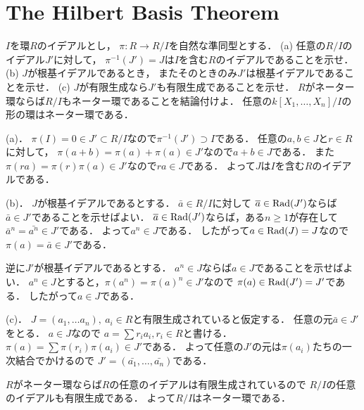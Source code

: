 \section{The Hilbert Basis Theorem}

\begin{prob}
  $I$を環$R$のイデアルとし，
  $\pi : R \to R/I$を自然な準同型とする．
  (a) 任意の$R/I$のイデアル$J'$に対して，
  $\pi^{-1}(J') = J$は$I$を含む$R$のイデアルであることを示せ．
  (b) $J$が根基イデアルであるとき，
  またそのときのみ$J'$は根基イデアルであることを示せ．
  (c) $J$が有限生成なら$J'$も有限生成であることを示せ．
  $R$がネーター環ならば$R/I$もネーター環であることを結論付けよ．
  任意の$k[X_1,\dots,X_n]/I$の形の環はネーター環である．
\end{prob}
\begin{ans}
  (a)．
  $\pi(I) = 0 \in J' \subset R/I$なので$\pi^{-1}(J') \supset I$である．
  任意の$ a,b \in J$と$r\in R$に対して，
  $\pi(a+b) = \pi(a) + \pi(a) \in J'$なので$a+b \in J$である．
  また$\pi(ra) = \pi(r)\pi(a) \in J'$なので$ra \in J$である．
  よって$J$は$I$を含む$R$のイデアルである．

  (b)．
  $J$が根基イデアルであるとする．
  $\bar{a}\in R/I$に対して
  $\overline{a}\in \mathrm{Rad}(J')$ならば$\bar{a} \in J'$であることを示せばよい．
  $\overline{a}\in \mathrm{Rad}(J')$ならば，ある$n\ge 1$が存在して
  $\bar{a}^n = \bar{a^n} \in J'$である．
  よって$a^n \in J$である．
  したがって$a \in \mathrm{Rad}(J) = J$なので
  $\pi(a) = \bar{a} \in J'$である．

  逆に$J'$が根基イデアルであるとする．
  $a^n \in J$ならば$a \in J$であることを示せばよい．
  $a^n \in J$とすると，$\pi(a^n) = \pi(a)^n \in J'$なので
  $\pi(a) \in \mathrm{Rad}(J') = J'$である．
  したがって$a \in J$である．

  (c)．
  $J = (a_1, \dots a_n), \ a_i \in R$と有限生成されていると仮定する．
  任意の元$\bar{a} \in J'$をとる．
  $a \in J$なので
  $a = \sum r_i a_i, r_i \in R$と書ける．
  $\pi(a) = \sum \pi(r_i) \pi(a_i) \in J'$である．
  よって任意の$J'$の元は$\pi(a_i)$たちの一次結合でかけるので
  $J' = (\bar{a_1} , \dots , \bar{a_n})$である．

  $R$がネーター環ならば$R$の任意のイデアルは有限生成されているので
  $R/I$の任意のイデアルも有限生成である．
  よって$R/I$はネーター環である．
\end{ans}
